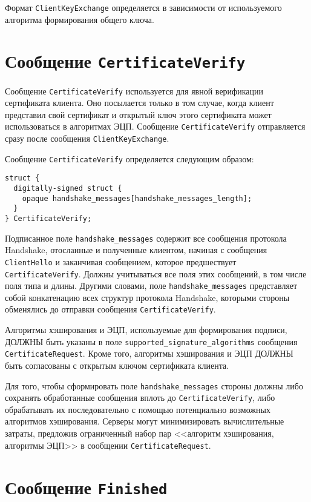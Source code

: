 Формат \lstinline{ClientKeyExchange} определяется в зависимости от используемого 
алгоритма формирования общего ключа. 

\section{Сообщение \lstinline{CertificateVerify}}\label{HANDSHAKE.14}

Сообщение \lstinline{CertificateVerify} используется для явной верификации
сертификата клиента. Оно посылается только в том случае, когда клиент
представил свой сертификат и открытый ключ этого сертификата может
использоваться в алгоритмах ЭЦП. Сообщение \lstinline{CertificateVerify}
отправляется сразу после сообщения \lstinline{ClientKeyExchange}.

Сообщение \lstinline{CertificateVerify} определяется следующим образом:
\begin{lstlisting}
struct {
  digitally-signed struct {
    opaque handshake_messages[handshake_messages_length];
  }
} CertificateVerify;
\end{lstlisting}

Подписанное поле \lstinline{handshake_messages} содержит все сообщения протокола 
Handshake, отосланные и полученные клиентом, начиная с сообщения 
\lstinline{ClientHello} и заканчивая сообщением, которое предшествует 
\lstinline{CertificateVerify}. Должны учитываться все поля этих сообщений, в том 
числе поля типа и длины. Другими словами, поле \lstinline{handshake_messages} 
представляет собой конкатенацию всех структур протокола Handshake, 
которыми стороны обменялись до отправки сообщения \lstinline{CertificateVerify}.  

Алгоритмы хэширования и ЭЦП, используемые для формирования подписи, ДОЛЖНЫ 
быть указаны в поле \lstinline{supported_signature_algorithms} сообщения 
\lstinline{CertificateRequest}. Кроме того, алгоритмы хэширования и ЭЦП ДОЛЖНЫ быть 
согласованы с открытым ключом сертификата клиента. 

Для того, чтобы сформировать поле \lstinline{handshake_messages} стороны должны либо 
сохранять обработанные сообщения вплоть до \lstinline{CertificateVerify}, либо 
обрабатывать их последовательно с помощью потенциально возможных 
алгоритмов хэширования. Серверы могут минимизировать вычислительные 
затраты, предложив ограниченный набор пар <<алгоритм хэширования, алгоритмы 
ЭЦП>> в сообщении \lstinline{CertificateRequest}. 

\section{Сообщение \lstinline{Finished}}\label{HANDSHAKE.15}
 
